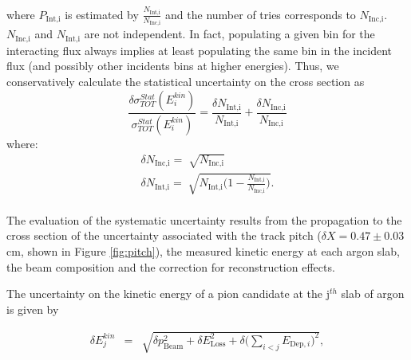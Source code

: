 \documentclass[aps,prl,twocolumn,showpacs,superscriptaddress,groupedaddress]{revtex4}  %
\begin{document}
where  $P_{\text{Int,i}}$ is estimated by $\frac{ N_{\text{Int,i}}}{N_{\text{Inc,i}}}$ and the number of tries corresponds to $N_{\text{Inc,i}}$. $N_{\text{Inc,i}}$ and $N_{\text{Int,i}}$ are not independent. In fact, populating a given bin for the interacting flux always implies at least populating the same bin in the incident flux  (and possibly other incidents bins at higher energies). Thus, we conservatively calculate the statistical uncertainty on the cross section as 
\begin{equation}
\frac{\delta\sigma^{Stat}_{TOT}(E^{kin}_i)}{\sigma^{Stat}_{TOT}(E^{kin}_i)} =  \frac{\delta N_{\text{Int,i}}}{N_{\text{Int,i}}}+\frac{\delta N_{\text{Inc,i}}}{N_{\text{Inc,i}}}
\end{equation}
where:
\begin{eqnarray}
\delta N_{\text{Inc,i}} = \sqrt[]{N_{\text{Inc,i}}} \\
\delta N_{\text{Int,i}} = \sqrt[]{N_{\text{Int,i}}\Big(1-\frac{ N_{\text{Int,i}}}{N_{\text{Inc,i}}}\Big)}.
\end{eqnarray} \\


The evaluation of the systematic uncertainty results from the propagation to the cross section of the uncertainty associated with  the track pitch  ($\delta X = 0.47 \pm 0.03 $ cm, shown in Figure \ref{fig:pitch}),  the measured kinetic energy at each argon slab,  the  beam composition and the correction for reconstruction effects. 

The uncertainty on the kinetic energy of a pion candidate at the j$^{th}$ slab of argon  is given by

\begin{eqnarray}
\delta E^{kin}_{j} &=& \sqrt{\delta p_{\text{Beam}}^2 + \delta E_{\text{Loss}}^2 +  \delta \Big(\sum_{i < j} E_{\text{Dep},i}\Big)^2}, 
\end{eqnarray}
\end{document}
